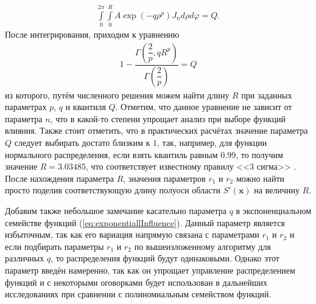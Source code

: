 \begin{gather*}
	\int\limits_0^{2\pi}
		\int\limits_0^{R}
			A \exp \left(-q\rho^p \right) J_n
		d \rho
	d \varphi = Q.
\end{gather*}
После интегрирования, приходим к уравнению
\begin{gather}
	\label{eq:quantil}
	1 - \dfrac{
		\Gamma \left( \dfrac{2}{p}, q R^p \right)
		}{
		\Gamma \left( \dfrac{2}{p} \right)
		} = Q
\end{gather}
из которого, путём численного решения можем найти длину $R$ при заданных параметрах $p$, $q$ и квантиля $Q$. Отметим, что данное уравнение не зависит от параметра $n$, что в какой-то степени упрощает анализ при выборе функций влияния. Также стоит отметить, что в практических расчётах значение параметра $Q$ следует выбирать достато близким к $1$, так, например, для функции нормального распределения, если взять квантиль равным 0.99, то получим значение $R = 3.03485$, что соответствует известному правилу <<3 сигма>> \cite{TeorVer}. После нахождения параметра $R$, значения параметров $r_1$ и $r_2$ можно найти просто поделив соответствующую длину полуоси области $S' (\boldsymbol{x})$ на величину $R$.

Добавим также небольшое замечание касательно параметра $q$ в экспоненциальном семействе функций (\ref{eq:exponentiallInfluence}). Данный параметр является избыточным, так как его вариация напрямую связана с параметрами $r_1$ и $r_2$ и если подбирать параметры $r_1$ и $r_2$ по вышеизложенному алгоритму для различных $q$, то распределения функций будут одинаковыми. Однако этот параметр введён намеренно, так как он упрощает управление распределением функций и с некоторыми оговорками будет использован в дальнейших исследованиях при сравнении с полиномиальным семейством функций.